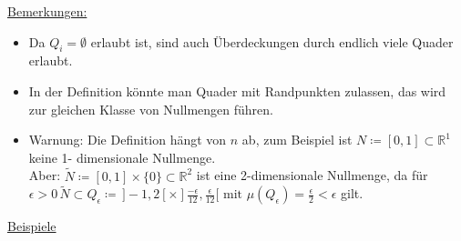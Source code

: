 \underline{Bemerkungen:}
\begin{itemize}
	\item Da $Q_i = \emptyset$ erlaubt ist, sind auch Überdeckungen durch endlich viele Quader erlaubt.
	\item In der Definition könnte man Quader mit Randpunkten zulassen, das wird zur gleichen Klasse von Nullmengen führen.
	\item Warnung: Die Definition hängt von $n$ ab, zum Beispiel ist $N\coloneqq [0,1] \subset \mathbb{R}^1$ keine 1- dimensionale Nullmenge.\\
	Aber: $\tilde{N}\coloneqq[0,1]\times\{0\}\subset\mathbb{R}^2$ ist eine 2-dimensionale Nullmenge, da für $\epsilon > 0 \, \tilde{N}\subset Q_{\epsilon}\coloneqq\, ]-1,2[ \times ]\frac{-\epsilon}{12}, \frac{\epsilon}{12}[ \text{ mit } \mu(Q_{\epsilon}) = \frac{\epsilon}{2} < \epsilon$ gilt.
\end{itemize}
\underline{Beispiele}

